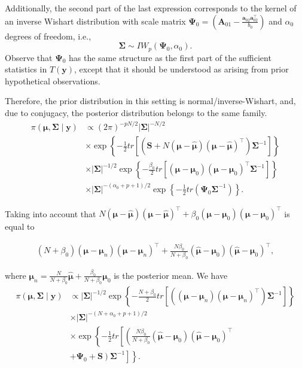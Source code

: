 \begin{enumerate}
Additionally, the second part of the last expression corresponds to the kernel of an inverse Wishart distribution with scale matrix \( \bm{\Psi}_0 = \left( \bm{A}_{01} - \frac{\bm{a}_{02} \bm{a}_{02}^{\top}}{b_0} \right) \) and \( \alpha_0 \) degrees of freedom, i.e.,
\[
\bm{\Sigma} \sim IW_p (\bm{\Psi}_0, \alpha_0).
\]
Observe that \( \bm{\Psi}_0 \) has the same structure as the first part of the sufficient statistics in \( T(\bm{y}) \), except that it should be understood as arising from prior hypothetical observations.

Therefore, the prior distribution in this setting is normal/inverse-Wishart, and, due to conjugacy, the posterior distribution belongs to the same family.
\begin{align*}
	\pi(\bm{\mu},\bm{\Sigma}\mid \bm{y})&\propto
	(2\pi)^{-p N/2}|\bm{\Sigma}|^{-N/2}\\
	&\times\exp\left\{-\frac{1}{2}tr\left[\left(\bm{S}+N\left(\bm{\mu}-\hat{\bm{\mu}}\right)\left(\bm{\mu}-\hat{\bm{\mu}}\right)^{\top}\right)\bm{\Sigma}^{-1}\right]\right\}\\
	&\times |\bm{\Sigma}|^{-1/2}\exp\left\{-\frac{\beta_0}{2}tr\left[(\bm{\mu}-\bm{\mu}_0)(\bm{\mu}-\bm{\mu}_0)^{\top}\bm{\Sigma}^{-1}\right]\right\}\\
	&\times|\bm{\Sigma}|^{-(\alpha_0+p+1)/2}\exp\left\{-\frac{1}{2}tr(\bm{\Psi}_0\bm{\Sigma}^{-1})\right\}.
\end{align*}

Taking into account that $	N\left(\bm{\mu}-\hat{\bm{\mu}}\right)\left(\bm{\mu}-\hat{\bm{\mu}}\right)^{\top}+\beta_0\left(\bm{\mu}-\bm{\mu}_0\right)\left(\bm{\mu}-\bm{\mu}_0\right)^{\top}$ is equal to 

\begin{align*}
(N+\beta_0)\left(\bm{\mu}-\bm{\mu}_n\right)\left(\bm{\mu}-\bm{\mu}_n\right)^{\top}+\frac{N\beta_0}{N+\beta_0}\left(\hat{\bm{\mu}}-\bm{\mu}_0\right)\left(\hat{\bm{\mu}}-\bm{\mu}_0\right)^{\top},
\end{align*}

where $\bm{\mu}_n=\frac{N}{N+\beta_0}\hat{\bm{\mu}}+\frac{\beta_0}{N+\beta_0}\bm{\mu}_0$ is the posterior mean. We have
\begin{align*}
	\pi(\bm{\mu},\bm{\Sigma}\mid \bm{y})&\propto |\bm\Sigma|^{-1/2}\exp\left\{-\frac{N+\beta_0}{2}tr\left[\left(\left(\bm{\mu}-\bm{\mu}_n\right)\left(\bm{\mu}-\bm{\mu}_n\right)^{\top}\right)\bm{\Sigma}^{-1}\right]\right\}\\
	&\times |\bm{\Sigma}|^{-(N+\alpha_0+p+1)/2}\\
	&\times\exp\left\{-\frac{1}{2}tr\left[\left(\frac{N\beta_0}{N+\beta_0}(\hat{\bm{\mu}}-\bm{\mu}_0)(\hat{\bm{\mu}}-\bm{\mu}_0)^{\top}\right.\right.\right.\\
	&+\left.\left.\left.\bm{\Psi}_0+\bm{S}\right)\bm{\Sigma}^{-1}\right]\right\}.
\end{align*}


\end{enumerate}
